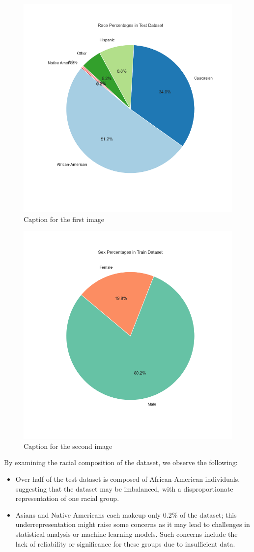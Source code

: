 \documentclass[conference]{IEEEtran}
\begin{document}
	
	\begin{figure}
		\centering
		\includegraphics[width=0.7\linewidth]{img/race_percentages_pie.png}
		\caption{Caption for the first image}
		\label{fig:image1}
	\end{figure}
	\hfill
	\begin{figure}
		\centering
		\includegraphics[width=0.7\linewidth]{img/sex_percentages_pie.png}
		\caption{Caption for the second image}
		\label{fig:image2}
	\end{figure}

	
	By examining the racial composition of the dataset, we observe the following:
	
	\begin{itemize}
		\item Over half of the test dataset is composed of African-American individuals, suggesting that the dataset may be imbalanced, with a disproportionate representation of one racial group.
		\item Asians and Native Americans each makeup only 0.2\% of the dataset; this underrepresentation might raise some concerns as it may lead to challenges in statistical analysis or machine learning models. Such concerns include the lack of reliability or significance for these groups due to insufficient data.
	\end{itemize}
		
\end{document}
